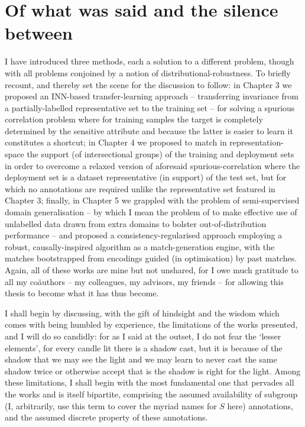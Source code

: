 \section*{Of what was said and the silence between}\label{sec:what-was-said}
%
I have introduced three methods, each a solution to a different problem, though with all problems
conjoined by a notion of distributional-robustness.
%
%
To briefly recount, and thereby set the scene for the discussion to follow: in Chapter 3 we
proposed an INN-based transfer-learning approach -- transferring invariance from a
partially-labelled representative set to the training set -- for solving a spurious correlation
problem where for training samples the target is completely determined by the sensitive attribute
and because the latter is easier to learn it constitutes a shortcut;
%
in Chapter 4 we proposed to match in representation-space the support (of intersectional groups) of
the training and deployment sets in order to overcome a relaxed version of aforesaid
spurious-correlation where the deployment set is a dataset representative (in support) of the test
set, but for which no annotations are required unlike the representative set featured in Chapter 3;
%
finally, in Chapter 5 we grappled with the problem of semi-supervised domain generalisation -- by
which I mean the problem of to make effective use of unlabelled data drawn from extra domains to
bolster out-of-distribution performance -- and proposed a consistency-regularised approach
employing a robust, causally-inspired algorithm as a match-generation engine, with the matches
bootstrapped from encodings guided (in optimisation) by past matches.
%
Again, all of these works are mine but not unshared, for I owe much gratitude to all my
co{\"a}uthors -- my colleagues, my advisors, my friends -- for allowing this thesis to become what
it has thus become.

%
%
I shall begin by discussing, with the gift of hindsight and the wisdom which comes with being
humbled by experience, the limitations of the works presented, and I will do so candidly: for as I
said at the outset, I do not fear the `lesser elements', for every candle lit there is a shadow
cast, but it is because of the shadow that we may see the light and we may learn to never cast the
same shadow twice or otherwise accept that is the shadow is right for the light.
%
Among these limitations, I shall begin with the most fundamental one that pervades all the works
and is itself bipartite, comprising the assumed availability of subgroup (I, arbitrarily, use this
term to cover the myriad names for \(S\) here) annotations, and the assumed discrete property of
these annotations.

